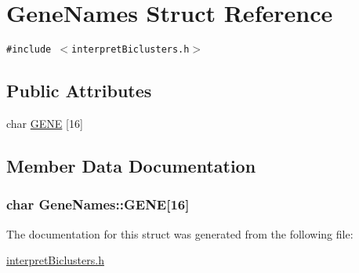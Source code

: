 \hypertarget{structGeneNames}{
\section{GeneNames Struct Reference}
\label{structGeneNames}
}
{\tt \#include $<$interpretBiclusters.h$>$}

\subsection*{Public Attributes}
\begin{CompactItemize}
\item 
char \hyperlink{structGeneNames_c1909fdf83e0361e4f5de6f528f69f0f}{GENE} \mbox{[}16\mbox{]}
\end{CompactItemize}


\subsection{Member Data Documentation}
\hypertarget{structGeneNames_c1909fdf83e0361e4f5de6f528f69f0f}{
\subsubsection[{GENE}]{\setlength{\rightskip}{0pt plus 5cm}char {\bf GeneNames::GENE}\mbox{[}16\mbox{]}}}
\label{structGeneNames_c1909fdf83e0361e4f5de6f528f69f0f}




The documentation for this struct was generated from the following file:\begin{CompactItemize}
\item 
\hyperlink{interpretBiclusters_8h}{interpretBiclusters.h}\end{CompactItemize}
